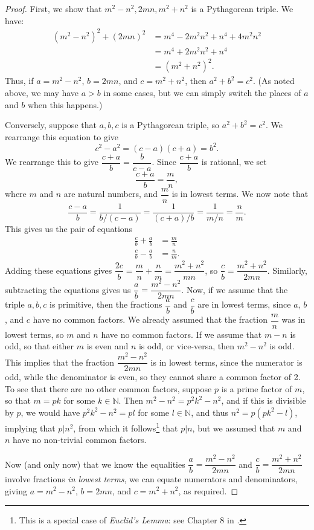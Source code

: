 \documentclass[letterpaper,12pt]{article}
\theoremstyle{definition}
\begin{document}
\begin{proof}
 First, we show that $m^2-n^2,2mn,m^2+n^2$ is a Pythagorean triple. We have:
\begin{align*}
 (m^2-n^2)^2+(2mn)^2 &= m^4-2m^2n^2+n^4 + 4m^2n^2\\
&=m^4+2m^2n^2+n^4\\
&=(m^2+n^2)^2.
\end{align*}
Thus, if $a=m^2-n^2$, $b=2mn$, and $c=m^2+n^2$, then $a^2+b^2=c^2$. (As noted above, we may have $a>b$ in some cases, but we can simply switch the places of $a$ and $b$ when this happens.)

Conversely, suppose that $a,b,c$ is a Pythagorean triple, so $a^2+b^2=c^2$. We rearrange this equation to give 
\[
c^2-a^2=(c-a)(c+a)=b^2. 
\]
We rearrange this to give $\dfrac{c+a}{b} = \dfrac{b}{c-a}$. Since $\dfrac{c+a}{b}$ is rational, we set
\[
 \frac{c+a}{b} = \frac{m}{n},
\]
where $m$ and $n$ are natural numbers, and $\dfrac{m}{n}$ is in lowest terms. We now note that
\[
 \frac{c-a}{b} = \frac{1}{b/(c-a)} = \frac{1}{(c+a)/b} = \frac{1}{m/n} = \frac{n}{m}.
\]
This gives us the pair of equations
\begin{align*}
 \frac{c}{b}+\frac{a}{b} &= \frac{m}{n}\\
 \frac{c}{b}-\frac{a}{b} & = \frac{n}{m}.
\end{align*}
Adding these equations gives $\dfrac{2c}{b} = \dfrac{m}{n}+\dfrac{n}{m} = \dfrac{m^2+n^2}{mn}$, so $\dfrac{c}{b} = \dfrac{m^2+n^2}{2mn}$. Similarly, subtracting the equations gives us $\dfrac{a}{b} = \dfrac{m^2-n^2}{2mn}$. Now, if we assume that the triple $a,b,c$ is primitive, then the fractions $\dfrac{a}{b}$ and $\dfrac{c}{b}$ are in lowest terms, since $a$, $b$, and $c$ have no common factors. We already assumed that the fraction $\dfrac{m}{n}$ was in lowest terms, so $m$ and $n$ have no common factors. If we assume that $m-n$ is odd, so that either $m$ is even and $n$ is odd, or vice-versa, then $m^2-n^2$ is odd. This implies that the fraction $\dfrac{m^2-n^2}{2mn}$ is in lowest terms, since the numerator is odd, while the denominator is even, so they cannot share a common factor of 2. To see that there are no other common factors, suppose $p$ is a prime factor of $m$, so that $m=pk$ for some $k\in\mathbb{N}$. Then $m^2-n^2 = p^2k^2-n^2$, and if this is divisible by $p$, we would have $p^2k^2-n^2 = pl$ for some $l\in\mathbb{N}$, and thus $n^2 = p(pk^2-l)$, implying that $p|n^2$, from which it follows\footnote{This is a special case of \textit{Euclid's Lemma}: see Chapter 8 in \cite{Su}.} that $p|n$,  but we assumed that $m$ and $n$ have no non-trivial common factors.

Now (and only now) that we know the equalities $\dfrac{a}{b}=\dfrac{m^2-n^2}{2mn}$ and $\dfrac{c}{b} = \dfrac{m^2+n^2}{2mn}$ involve fractions \textit{in lowest terms}, we can equate numerators and denominators, giving $a=m^2-n^2$, $b=2mn$, and $c=m^2+n^2$, as required.
\end{proof}
\end{document}
